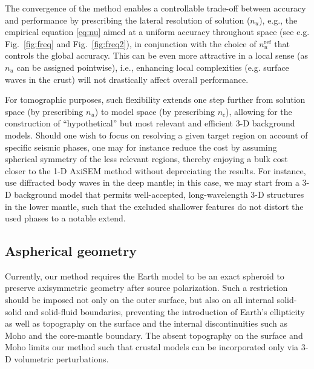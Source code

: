 \documentclass[extra]{gji}
\begin{document}
The convergence of the method enables a controllable 
trade-off between accuracy and performance by prescribing the lateral
resolution of solution ($n_u$), e.g., 
the empirical equation \eqref{eq:nu} aimed at a uniform
accuracy throughout space (see e.g. Fig.~\ref{fig:freq} and Fig.~\ref{fig:freq2}), 
in conjunction with the choice of $n_u^\text{ref}$  
that controls the global accuracy.
This can be even more attractive in a local sense 
(as $n_u$ can be assigned pointwise), i.e., enhancing local complexities   
(e.g. surface waves in the crust) will not drastically affect overall 
performance.

For tomographic purposes, such flexibility extends one step further from solution 
space (by prescribing $n_u$) to model space (by prescribing $n_c$), allowing 
for the construction of ``hypothetical'' but 
most relevant and efficient 3-D background models.
Should one wish to focus on resolving 
a given target region on account of specific seismic phases, 
one may for instance reduce the cost by assuming spherical symmetry of 
the less relevant regions, thereby enjoying a bulk cost closer to the 1-D 
AxiSEM method without depreciating the results.
For instance, \cite{hosseini2015multifrequency} use diffracted body waves 
in the deep mantle; in this case, we may start from a 3-D background model 
that permits well-accepted, long-wavelength 3-D structures in the lower 
mantle, such that the excluded shallower features do not distort the 
used phases to a notable extend.

\subsection{Aspherical geometry}
\label{sec:geo}
Currently, our method requires the Earth model to be an exact 
spheroid to preserve axisymmetric geometry after source polarization. 
Such a restriction should be imposed not only on the outer surface, 
but also on all internal solid-solid and solid-fluid boundaries, 
preventing the introduction of Earth's ellipticity as well as topography 
on the surface and the internal discontinuities such as Moho and 
the core-mantle boundary.
The absent topography on the surface and Moho limits our method such that 
crustal models can be incorporated only via 3-D volumetric perturbations. 
\end{document}
